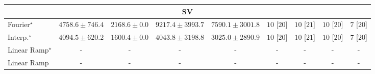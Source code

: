 \begin{tabular}{l|cccc|cccc|}
\cline{1-9}
\multicolumn{9}{c}{\rule{0pt}{8pt}SV} \\
\midrule
Fourier$^\star$ & {\cellcolor[HTML]{96B6D7}} \color[HTML]{000000} $4758.6\pm 746.4$ & {\cellcolor[HTML]{F4EDF6}} \color[HTML]{000000} $2168.6\pm 0.0$ & {\cellcolor[HTML]{023858}} \color[HTML]{F1F1F1} $9217.4\pm 3993.7$ & {\cellcolor[HTML]{0569A5}} \color[HTML]{F1F1F1} $7590.1\pm 3001.8$ & {\cellcolor[HTML]{49006A}} \color[HTML]{F1F1F1} $10$ [$20$] & {\cellcolor[HTML]{49006A}} \color[HTML]{F1F1F1} $10$ [$21$] & {\cellcolor[HTML]{49006A}} \color[HTML]{F1F1F1} $10$ [$20$] & {\cellcolor[HTML]{CD238F}} \color[HTML]{F1F1F1} $7$ [$20$] \\
Interp.$^\star$ & {\cellcolor[HTML]{B7C5DF}} \color[HTML]{000000} $4094.5\pm 620.2$ & {\cellcolor[HTML]{FFF7FB}} \color[HTML]{000000} $1600.4\pm 0.0$ & {\cellcolor[HTML]{B8C6E0}} \color[HTML]{000000} $4043.8\pm 3198.8$ & {\cellcolor[HTML]{DFDDEC}} \color[HTML]{000000} $3025.0\pm 2890.9$ & {\cellcolor[HTML]{49006A}} \color[HTML]{F1F1F1} $10$ [$20$] & {\cellcolor[HTML]{49006A}} \color[HTML]{F1F1F1} $10$ [$21$] & {\cellcolor[HTML]{49006A}} \color[HTML]{F1F1F1} $10$ [$20$] & {\cellcolor[HTML]{CD238F}} \color[HTML]{F1F1F1} $7$ [$20$] \\
Linear Ramp$^\star$ & {\cellcolor[HTML]{000000}} \color[HTML]{F1F1F1} {\cellcolor{white}} \color{black} - & {\cellcolor[HTML]{000000}} \color[HTML]{F1F1F1} {\cellcolor{white}} \color{black} - & {\cellcolor[HTML]{000000}} \color[HTML]{F1F1F1} {\cellcolor{white}} \color{black} - & {\cellcolor[HTML]{000000}} \color[HTML]{F1F1F1} {\cellcolor{white}} \color{black} - & {\cellcolor[HTML]{000000}} \color[HTML]{F1F1F1} {\cellcolor{white}} \color{black} - & {\cellcolor[HTML]{000000}} \color[HTML]{F1F1F1} {\cellcolor{white}} \color{black} - & {\cellcolor[HTML]{000000}} \color[HTML]{F1F1F1} {\cellcolor{white}} \color{black} - & {\cellcolor[HTML]{000000}} \color[HTML]{F1F1F1} {\cellcolor{white}} \color{black} - \\
Linear Ramp & {\cellcolor[HTML]{000000}} \color[HTML]{F1F1F1} {\cellcolor{white}} \color{black} - & {\cellcolor[HTML]{000000}} \color[HTML]{F1F1F1} {\cellcolor{white}} \color{black} - & {\cellcolor[HTML]{000000}} \color[HTML]{F1F1F1} {\cellcolor{white}} \color{black} - & {\cellcolor[HTML]{000000}} \color[HTML]{F1F1F1} {\cellcolor{white}} \color{black} - & {\cellcolor[HTML]{000000}} \color[HTML]{F1F1F1} {\cellcolor{white}} \color{black} - & {\cellcolor[HTML]{000000}} \color[HTML]{F1F1F1} {\cellcolor{white}} \color{black} - & {\cellcolor[HTML]{000000}} \color[HTML]{F1F1F1} {\cellcolor{white}} \color{black} - & {\cellcolor[HTML]{000000}} \color[HTML]{F1F1F1} {\cellcolor{white}} \color{black} - \\

\end{tabular}
